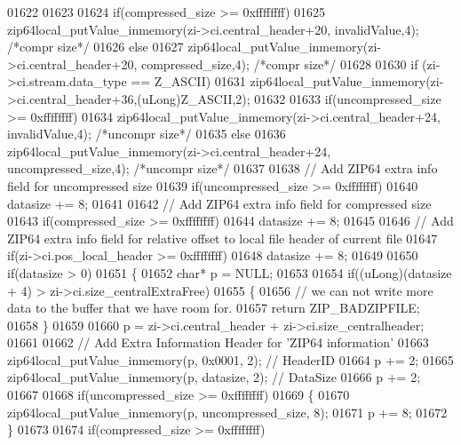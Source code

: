 \begin{DoxyCode}
01622 
01623 
01624     \textcolor{keywordflow}{if}(compressed\_size >= 0xffffffff)
01625       zip64local\_putValue\_inmemory(zi->ci.central\_header+20, invalidValue,4); \textcolor{comment}{/*compr size*/}
01626     \textcolor{keywordflow}{else}
01627       zip64local\_putValue\_inmemory(zi->ci.central\_header+20, compressed\_size,4); \textcolor{comment}{/*compr size*/}
01628 
01630     \textcolor{keywordflow}{if} (zi->ci.stream.data\_type == Z\_ASCII)
01631         zip64local\_putValue\_inmemory(zi->ci.central\_header+36,(uLong)Z\_ASCII,2);
01632 
01633     \textcolor{keywordflow}{if}(uncompressed\_size >= 0xffffffff)
01634       zip64local\_putValue\_inmemory(zi->ci.central\_header+24, invalidValue,4); \textcolor{comment}{/*uncompr size*/}
01635     \textcolor{keywordflow}{else}
01636       zip64local\_putValue\_inmemory(zi->ci.central\_header+24, uncompressed\_size,4); \textcolor{comment}{/*uncompr size*/}
01637 
01638     \textcolor{comment}{// Add ZIP64 extra info field for uncompressed size}
01639     \textcolor{keywordflow}{if}(uncompressed\_size >= 0xffffffff)
01640       datasize += 8;
01641 
01642     \textcolor{comment}{// Add ZIP64 extra info field for compressed size}
01643     \textcolor{keywordflow}{if}(compressed\_size >= 0xffffffff)
01644       datasize += 8;
01645 
01646     \textcolor{comment}{// Add ZIP64 extra info field for relative offset to local file header of current file}
01647     \textcolor{keywordflow}{if}(zi->ci.pos\_local\_header >= 0xffffffff)
01648       datasize += 8;
01649 
01650     \textcolor{keywordflow}{if}(datasize > 0)
01651     \{
01652       \textcolor{keywordtype}{char}* p = NULL;
01653 
01654       \textcolor{keywordflow}{if}((uLong)(datasize + 4) > zi->ci.size\_centralExtraFree)
01655       \{
01656         \textcolor{comment}{// we can not write more data to the buffer that we have room for.}
01657         \textcolor{keywordflow}{return} ZIP\_BADZIPFILE;
01658       \}
01659 
01660       p = zi->ci.central\_header + zi->ci.size\_centralheader;
01661 
01662       \textcolor{comment}{// Add Extra Information Header for 'ZIP64 information'}
01663       zip64local\_putValue\_inmemory(p, 0x0001, 2); \textcolor{comment}{// HeaderID}
01664       p += 2;
01665       zip64local\_putValue\_inmemory(p, datasize, 2); \textcolor{comment}{// DataSize}
01666       p += 2;
01667 
01668       \textcolor{keywordflow}{if}(uncompressed\_size >= 0xffffffff)
01669       \{
01670         zip64local\_putValue\_inmemory(p, uncompressed\_size, 8);
01671         p += 8;
01672       \}
01673 
01674       \textcolor{keywordflow}{if}(compressed\_size >= 0xffffffff)

\end{DoxyCode}
